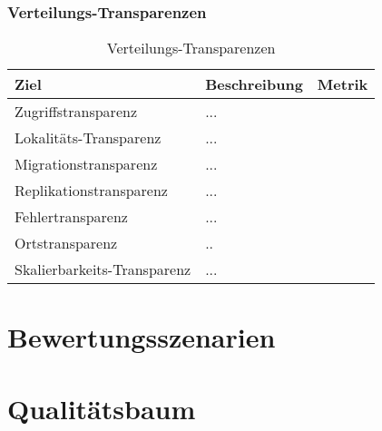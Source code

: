 \newpage
\subsubsection{Verteilungs-Transparenzen}
\begin{table}[h!]
	\centering
	\begin{tabular}{p{4cm}|p{5cm}|p{5cm}|}
		\hline
		\textbf{Ziel} & \textbf{Beschreibung} & \textbf{Metrik} \\
		\hline
		Zugriffstransparenz   & ...&\\
		\hline
		Lokalitäts-Transparenz  & ...&\\
		\hline
		Migrationstransparenz & ...&\\
		\hline
		Replikationstransparenz &...&\\
		\hline
		Fehlertransparenz &... &\\
		\hline
		Ortstransparenz & .. &\\
		\hline
		Skalierbarkeits-Transparenz & ... & \\
		\hline
	\end{tabular}
	\caption{Verteilungs-Transparenzen}
	\label{tab:transparenzen}
\end{table}

\section{Bewertungsszenarien}

\section{Qualitätsbaum}
